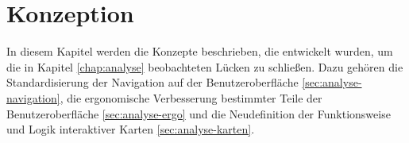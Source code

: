 \chapter{Konzeption} \label{chap:konzeption}

In diesem Kapitel werden die Konzepte beschrieben, die entwickelt wurden, um die in Kapitel \ref{chap:analyse} beobachteten Lücken zu schließen.
Dazu gehören die Standardisierung der Navigation auf der Benutzeroberfläche \ref{sec:analyse-navigation}, die ergonomische Verbesserung bestimmter Teile der Benutzeroberfläche \ref{sec:analyse-ergo} und die Neudefinition der Funktionsweise und Logik interaktiver Karten \ref{sec:analyse-karten}.



